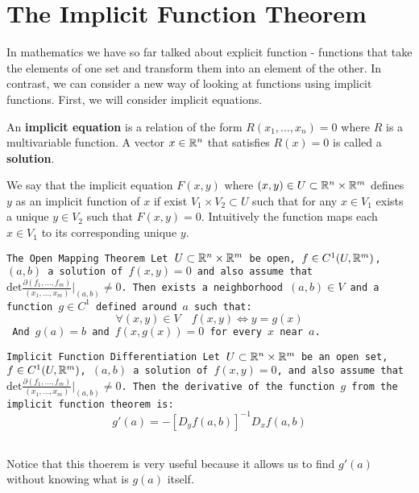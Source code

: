 \documentclass[11pt,a4paper]{article}
\begin{document}
\newpage


\section{The Implicit Function Theorem}
In mathematics we have so far talked about explicit function - functions
that take the elements of one set and transform them into an element
of the other. In contrast, we can consider a new way of looking at
functions using implicit functions. First, we will consider 
implicit equations.
\begin{definition}
  An \textbf{implicit equation} is a relation of the form 
  $R(x_1,\dots,x_n) = 0$ where $R$ is a multivariable function.
  A vector $x \in \mathbb{R}^n$ that satisfies $R(x) = 0$ is called a
  \textbf{solution}.
\end{definition}
We say that the implicit equation $F(x,y)$ where 
$(x,y) \in U \subset \mathbb{R}^n \times \mathbb{R}^m$ defines $y$ as an implicit 
function of $x$ if exist $V_1 \times V_2 \subset U$ such that 
for any $x \in V_1$ exists a unique $y \in V_2$ such that $F(x,y) = 0$.
Intuitively the function maps each $x \in V_1$ to its corresponding
unique $y$.
\begin{theorem}
  \tt{The Open Mapping Theorem}
  Let $U \subset \mathbb{R}^n \times \mathbb{R}^m$ be open, $f \in C^1(U,\mathbb{R}^m)$, $(a,b)$ 
  a solution of $f(x,y) = 0$ and also assume that $\mathrm{det}
  \frac{\partial(f_1,\dots,f_m)}{(x_1,\dots,x_m)}\vert_{(a,b)} \neq 0$.
  Then exists a neighborhood $(a,b) \in V$ and a function $g \in C^1$ 
  defined around $a$ such that:
  \[
    \forall (x,y) \in V \quad f(x,y) \iff y = g(x)
  \]
  And $g(a) = b$ and $f(x,g(x)) = 0$ for every $x$ near $a$.
\end{theorem}
\begin{theorem}
  \tt{Implicit Function Differentiation}
  Let $U \subset \mathbb{R}^n \times \mathbb{R}^m$ be an open set, $f \in C^1(U,\mathbb{R}^m)$, 
  $(a,b)$ a solution of $f(x,y) = 0$, and also assume that $\mathrm{det}
  \frac{\partial(f_1,\dots,f_m)}{(x_1,\dots,x_m)}\vert_{(a,b)} \neq 0$.
  Then the derivative of the function $g$ from the implicit function
  theorem is:
  \[
    g'(a) = -[D_y f(a,b)]^{-1} D_x f(a,b)
  \]
\end{theorem}
Notice that this thoerem is very useful because it allows us to find
$g'(a)$ without knowing what is $g(a)$ itself.


\newpage
\end{document}
